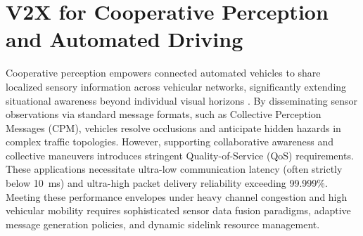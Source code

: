 \section{V2X for Cooperative Perception and Automated Driving}
\label{sec:cooperative_perception}

Cooperative perception empowers connected automated vehicles to share localized sensory information across vehicular networks, significantly extending situational awareness beyond individual visual horizons \cite{etsi_cpm_2019}.
By disseminating sensor observations via standard message formats, such as Collective Perception Messages (CPM), vehicles resolve occlusions and anticipate hidden hazards in complex traffic topologies.
However, supporting collaborative awareness and collective maneuvers introduces stringent Quality-of-Service (QoS) requirements.
These applications necessitate ultra-low communication latency (often strictly below 10~ms) and ultra-high packet delivery reliability exceeding 99.999\%.
Meeting these performance envelopes under heavy channel congestion and high vehicular mobility requires sophisticated sensor data fusion paradigms, adaptive message generation policies, and dynamic sidelink resource management.

